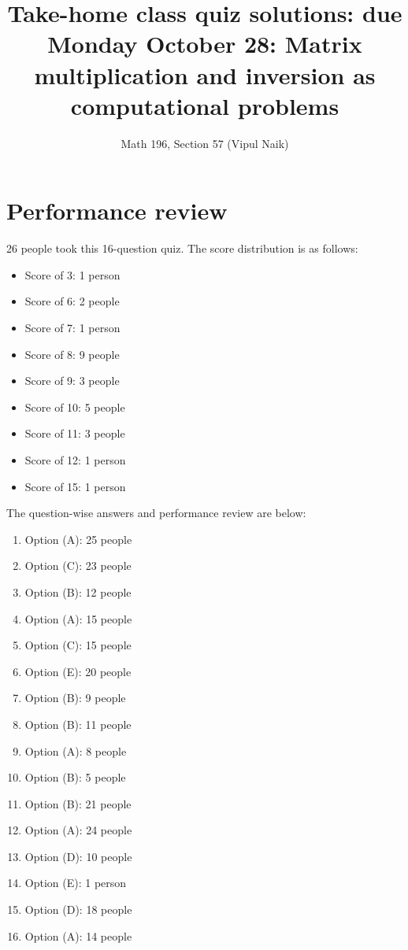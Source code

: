 \documentclass[10pt]{amsart}
\title{Take-home class quiz solutions: due Monday October 28: Matrix multiplication and inversion as computational problems}
\author{Math 196, Section 57 (Vipul Naik)}
\begin{document}
\maketitle

\section{Performance review}

26 people took this 16-question quiz. The score distribution is as
follows:

\begin{itemize}
\item Score of 3: 1 person
\item Score of 6: 2 people
\item Score of 7: 1 person
\item Score of 8: 9 people
\item Score of 9: 3 people
\item Score of 10: 5 people
\item Score of 11: 3 people
\item Score of 12: 1 person
\item Score of 15: 1 person
\end{itemize}

The question-wise answers and performance review are below:

\begin{enumerate}
\item Option (A): 25 people%
\item Option (C): 23 people%
\item Option (B): 12 people%
\item Option (A): 15 people%
\item Option (C): 15 people%
\item Option (E): 20 people%
\item Option (B): 9 people%
\item Option (B): 11 people%
\item Option (A): 8 people%
\item Option (B): 5 people%
\item Option (B): 21 people%
\item Option (A): 24 people%
\item Option (D): 10 people%
\item Option (E): 1 person%
\item Option (D): 18 people%
\item Option (A): 14 people%
\end{enumerate}
\end{document}
